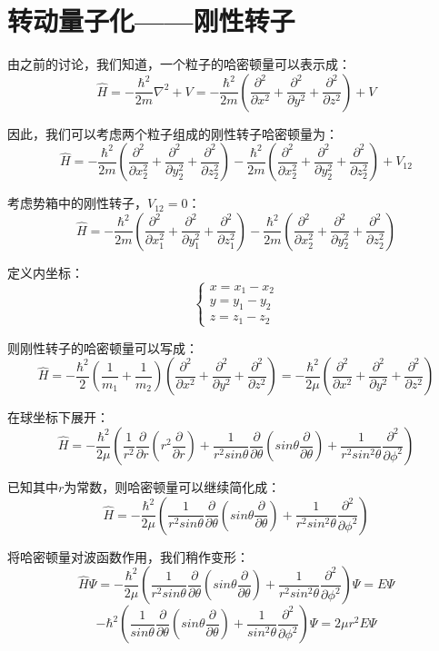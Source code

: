 \section{转动量子化——刚性转子}
由之前的讨论，我们知道，一个粒子的哈密顿量可以表示成：
\[\hat{H}=-\frac{\hbar^2}{2m}\nabla^2 + V=-\frac{\hbar^2}{2m}\left ( \frac{\partial^2}{\partial x^2}+\frac{\partial^2}{\partial y^2}+\frac{\partial^2}{\partial z^2}\right ) + V\]

因此，我们可以考虑两个粒子组成的刚性转子哈密顿量为：
\[\hat{H}=-\frac{\hbar^2}{2m}\left ( \frac{\partial^2}{\partial x_2^2}+\frac{\partial^2}{\partial y_2^2}+\frac{\partial^2}{\partial z_2^2}\right ) -\frac{\hbar^2}{2m}\left ( \frac{\partial^2}{\partial x_2^2}+\frac{\partial^2}{\partial y_2^2}+\frac{\partial^2}{\partial z_2^2}\right ) + V_{12}\]

考虑势箱中的刚性转子，$V_{12}=0$：
\[\hat{H}=-\frac{\hbar^2}{2m}\left ( \frac{\partial^2}{\partial x_1^2}+\frac{\partial^2}{\partial y_1^2}+\frac{\partial^2}{\partial z_1^2}\right ) -\frac{\hbar^2}{2m}\left ( \frac{\partial^2}{\partial x_2^2}+\frac{\partial^2}{\partial y_2^2}+\frac{\partial^2}{\partial z_2^2}\right )\]

定义内坐标：
\[ \left \{
    \begin{array}{ll}
        x=x_1-x_2  \\
        y=y_1-y_2  \\
        z=z_1-z_2
    \end{array}
    \right .
\]

则刚性转子的哈密顿量可以写成：
\[\hat{H}=-\frac{\hbar^2}{2}\left (\frac{1}{m_1}+\frac{1}{m_2}\right )\left ( \frac{\partial^2}{\partial x^2}+\frac{\partial^2}{\partial y^2}+\frac{\partial^2}{\partial z^2}\right )=-\frac{\hbar^2}{2\mu}\left ( \frac{\partial^2}{\partial x^2}+\frac{\partial^2}{\partial y^2}+\frac{\partial^2}{\partial z^2}\right ) \]

在球坐标下展开：
\[\hat{H}=-\frac{\hbar^2}{2\mu} \left (\frac{1}{r^2}\frac{\partial}{\partial{r}}(r^2\frac{\partial}{\partial{r}})+\frac{1}{r^2sin\theta}\frac{\partial}{\partial{\theta}}(sin\theta\frac{\partial}{\partial{\theta}})+\frac{1}{r^2sin^2 \theta }\frac{\partial^2}{\partial{\phi^2}} \right )\]

已知其中$r$为常数，则哈密顿量可以继续简化成：
\[\hat{H}=-\frac{\hbar^2}{2\mu} \left (\frac{1}{r^2sin\theta}\frac{\partial}{\partial{\theta}}(sin\theta\frac{\partial}{\partial{\theta}})+\frac{1}{r^2sin^2 \theta }\frac{\partial^2}{\partial{\phi^2}} \right )\]

将哈密顿量对波函数作用，我们稍作变形：
\[\hat{H}\varPsi=-\frac{\hbar^2}{2\mu} \left (\frac{1}{r^2sin\theta}\frac{\partial}{\partial{\theta}}(sin\theta\frac{\partial}{\partial{\theta}})+\frac{1}{r^2sin^2 \theta }\frac{\partial^2}{\partial{\phi^2}} \right )\varPsi=E\varPsi\]
\[-\hbar^2\left (\frac{1}{sin\theta}\frac{\partial}{\partial{\theta}}(sin\theta\frac{\partial}{\partial{\theta}})+\frac{1}{sin^2 \theta }\frac{\partial^2}{\partial{\phi^2}} \right )\varPsi=2\mu r^2 E\varPsi\]

